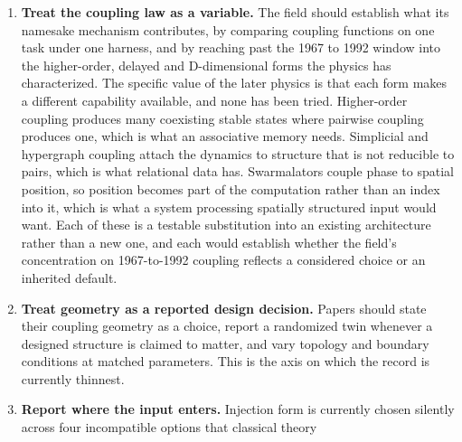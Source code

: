 \documentclass[a4paper,fleqn]{cas-sc}
\newcounter{none} %
\begin{document}
\begin{enumerate}
  resulting number rather than only the headline result. Where a control
  does not apply it is worth saying so and saying why: a frozen twin
  means nothing for a system whose dynamics is never trained, and a
  coupling ablation means nothing for a model that has no coupling term.
  An unreported control and an inapplicable one look identical to a
  reader, and distinguishing them took us a close reading of every paper
  in Table 1; an earlier draft of this survey still got several of them
  wrong, which is the argument for a standard rather than for close
  reading. Where two papers from one group publish the two sides of an
  ablation, as coRNN and UnICORNN do for damping and coupling and LinOSS
  and D-LinOSS do for damping, the standard would ask for the comparison
  to be run once more, under one protocol, in the later paper.
\item
  \textbf{Treat the coupling law as a variable.} The field should
  establish what its namesake mechanism contributes, by comparing
  coupling functions on one task under one harness, and by reaching past
  the 1967 to 1992 window into the higher-order, delayed and
  D-dimensional forms the physics has characterized. The specific value
  of the later physics is that each form makes a different capability
  available, and none has been tried. Higher-order coupling produces
  many coexisting stable states where pairwise coupling produces one,
  which is what an associative memory needs. Simplicial and hypergraph
  coupling attach the dynamics to structure that is not reducible to
  pairs, which is what relational data has. Swarmalators couple phase to
  spatial position, so position becomes part of the computation rather
  than an index into it, which is what a system processing spatially
  structured input would want. Each of these is a testable substitution
  into an existing architecture rather than a new one, and each would
  establish whether the field's concentration on 1967-to-1992 coupling
  reflects a considered choice or an inherited default.
\item
  \textbf{Treat geometry as a reported design decision.} Papers should
  state their coupling geometry as a choice, report a randomized twin
  whenever a designed structure is claimed to matter, and vary topology
  and boundary conditions at matched parameters. This is the axis on
  which the record is currently thinnest.
\item
  \textbf{Report where the input enters.} Injection form is currently
  chosen silently across four incompatible options that classical theory

\end{enumerate}
\end{document}
